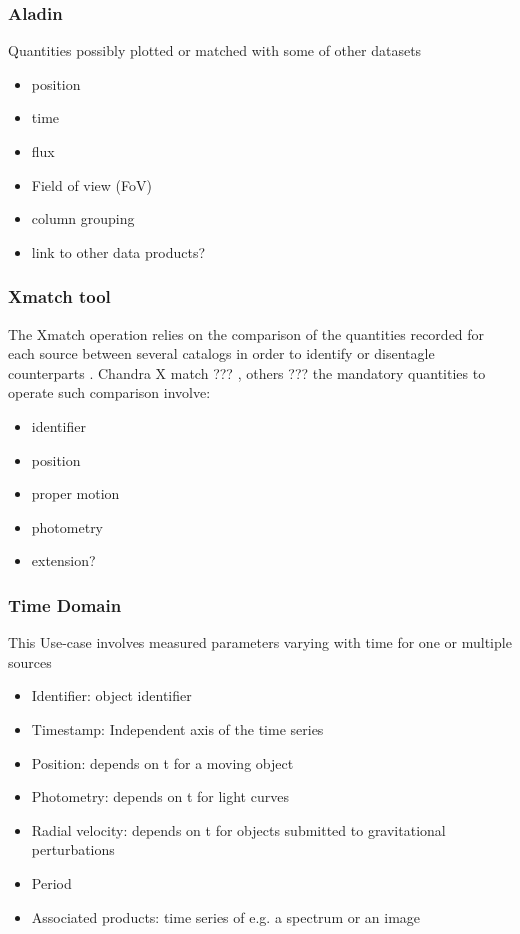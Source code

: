 \documentclass[11pt,a4paper]{ivoa}
\begin{document}
\subsubsection{Aladin}

Quantities possibly plotted or matched with some of other datasets
\begin{itemize}
    \item position
    \item time
    \item flux
    \item Field of view (FoV)
    \item column grouping
    \item link to other data products?
\end{itemize}

\subsubsection{X\-match tool }
The Xmatch operation relies on the comparison of the quantities recorded for each source between several catalogs in order to identify or disentagle counterparts .
Chandra X match ??? , others ???
the mandatory quantities to operate such comparison involve:
\begin{itemize}
    \item identifier
    \item position
    \item proper motion
    \item photometry
    \item extension?
\end{itemize}

\subsubsection{Time Domain }

This Use-case involves measured parameters varying with time
for one or multiple sources

 \begin{itemize}
    \item Identifier: object identifier
    \item Timestamp: Independent axis of the time series
    \item Position: depends on t for a moving object
    \item Photometry: depends on t for light curves
    \item Radial velocity: depends on t for objects submitted to gravitational perturbations
    \item Period
    \item Associated products: time series of e.g. a spectrum or an image

\end{itemize}
\end{document}
